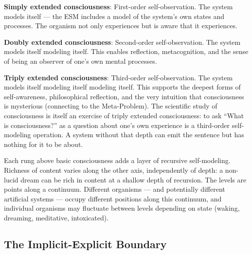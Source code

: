 \documentclass[12pt]{article}
\begin{document}
\textbf{Simply extended consciousness}: First-order self-observation. The system models itself --- the ESM includes a model of the system's own states and processes. The organism not only experiences but is aware that it experiences.

\textbf{Doubly extended consciousness}: Second-order self-observation. The system models itself modeling itself. This enables reflection, metacognition, and the sense of being an observer of one's own mental processes.

\textbf{Triply extended consciousness}: Third-order self-observation. The system models itself modeling itself modeling itself. This supports the deepest forms of self-awareness, philosophical reflection, and the very intuition that consciousness is mysterious (connecting to the Meta-Problem). The scientific study of consciousness is itself an exercise of triply extended consciousness: to ask ``What is consciousness?'' as a question about one's own experience is a third-order self-modeling operation. A system without that depth can emit the sentence but has nothing for it to be about.

Each rung above basic consciousness adds a layer of recursive self-modeling. Richness of content varies along the other axis, independently of depth: a non-lucid dream can be rich in content at a shallow depth of recursion. The levels are points along a continuum. Different organisms --- and potentially different artificial systems --- occupy different positions along this continuum, and individual organisms may fluctuate between levels depending on state (waking, dreaming, meditative, intoxicated).


\subsection{The Implicit-Explicit Boundary}
\end{document}
